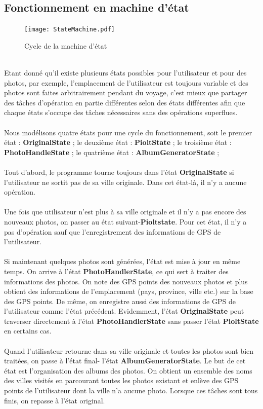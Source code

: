 \documentclass{article}
\begin{document}
\vspace{0.2 cm}
\subsection{\Large Fonctionnement en machine d'état}

\newpage
\begin{figure}[h!]
\centering
\texttt{[image: StateMachine.pdf]}
\caption{Cycle de la machine d'état}
\end{figure}
\ \\
Etant donné qu’il existe plusieurs états possibles pour l’utilisateur et pour des photos, par exemple,  l’emplacement de l’utilisateur est toujours variable et des photos sont faites arbitrairement pendant du voyage, c’est mieux que partager des tâches d’opération en partie différentes selon des états différentes  afin que chaque états s’occupe des tâches nécessaires sans des opérations superflues.
\\\\
Nous modélisons quatre états pour une cycle du fonctionnement, soit le premier état : {\bf OriginalState }; le deuxième état : {\bf PioltState} ; le troisième état : {\bf PhotoHandleState} ; le quatrième état : {\bf AlbumGeneratorState} ; 
\\\\
Tout d’abord, le programme tourne toujours dans l’état {\bf OriginalState} si l’utilisateur ne sortit pas de sa ville originale. Dans cet état-là, il n’y a aucune opération.
\\\\
Une fois que utilisateur n’est plus à sa ville originale et il n’y a pas encore des nouveaux photos, on passer au état suivant-{\bf Pioltstate}. Pour cet état, il n’y a pas d’opération sauf que l’enregistrement des informations de GPS de l’utilisateur.
\\\\
Si maintenant quelques photos sont générées, l’état est mise à jour en même temps. On arrive à l’état {\bf PhotoHandlerState}, ce qui sert à traiter des informations des photos. On note des GPS points des nouveaux photos et plus obtient des informations de l’emplacement (pays, province, ville etc.) sur la base des GPS points. De même, on enregistre aussi des informations de GPS de l’utilisateur comme l’état précédent. Evidemment, l’état {\bf OriginalState} peut traverser directement à l’état {\bf PhotoHandlerState} sans passer l’état {\bf PioltState} en certains cas.
\\\\
Quand l’utilisateur retourne dans sa ville originale et toutes les photos sont bien traitées, on passe à l’état final- l’état {\bf AlbumGeneratorState}. Le but de cet état est l’organisation des albums des photos. On obtient un ensemble des noms des villes visités en parcourant toutes les photos existant et enlève des GPS points de l’utilisateur dont la ville n’a aucune photo. Lorsque ces tâches sont tous finis, on repasse à l’état original.
\end{document}
